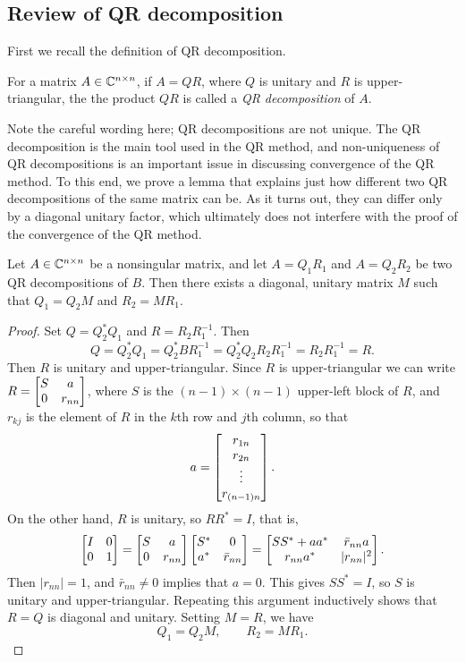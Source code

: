 \documentclass{article}
\begin{document}
\subsection{Review of QR decomposition}

First we recall the definition of QR decomposition.
\begin{definition}
	For a matrix $A \in \mathbb{C}^{n\times n}$, if $A = QR$, where $Q$ is unitary and $R$ is upper-triangular, the the product $QR$ is called a \emph{QR decomposition} of $A$.
\end{definition}
Note the careful wording here; QR decompositions are not unique. The QR decomposition is the main tool used in the QR method, and non-uniqueness of QR decompositions is an important issue in discussing convergence of the QR method. To this end, we prove a lemma that explains just how different two QR decompositions of the same matrix can be. As it turns out, they can differ only by a diagonal unitary factor, which ultimately does not interfere with the proof of the convergence of the QR method.

\begin{lemma}
	\label{lemma:qr_uniqueness}
	Let $A \in \mathbb{C}^{n\times n}$ be a nonsingular matrix, and let $A = Q_1R_1$ and $A = Q_2R_2$ be two QR decompositions of $B$. Then there exists a diagonal, unitary matrix $M$ such that $Q_1 = Q_2M$ and $R_2 = MR_1$.
\end{lemma}
\begin{proof}
	Set $Q = Q_2^*Q_1$ and $R = R_2R_1^{-1}$. Then
	\begin{equation*}
		Q = Q_2^*Q_1 = Q_2^*BR_1^{-1} = Q_2^*Q_2R_2R_1^{-1} = R_2R_1^{-1} = R.
	\end{equation*}
	Then $R$ is unitary and upper-triangular. Since $R$ is upper-triangular we can write $R = \left[\begin{matrix}S & a \\ 0 & r_{nn}\end{matrix}\right]$, where $S$ is the $(n-1)\times(n-1)$ upper-left block of $R$, and $r_{kj}$ is the element of $R$ in the $k$th row and $j$th column, so that
	\begin{equation*}
		a = \left[\begin{matrix}r_{1n} \\  r_{2n} \\\vdots\\r_{(n-1)n}\end{matrix}\right].
	\end{equation*}
	On the other hand, $R$ is unitary, so $RR^* = I$, that is,
	\begin{equation*}
		\left[\begin{matrix}I & 0 \\ 0 & 1\end{matrix}\right] = \left[\begin{matrix}S & a \\ 0 & r_{nn}\end{matrix}\right]\left[\begin{matrix}S^* & 0 \\ a^* & \bar{r}_{nn}\end{matrix}\right] = \left[\begin{matrix}SS^* +aa^* & \bar{r}_{nn}a \\ r_{nn}a^* & |r_{nn}|^2\end{matrix}\right].
	\end{equation*}
	Then $|r_{nn}|=1$, and $\bar{r}_{nn}\ne0$ implies that $a=0$. This gives $SS^* = I$, so $S$ is unitary and upper-triangular. Repeating this argument inductively shows that $R=Q$ is diagonal and unitary. Setting $M = R$, we have
	\begin{equation*}
		Q_1 = Q_2M, \qquad R_2 = MR_1.
	\end{equation*}
\end{proof}
\end{document}
